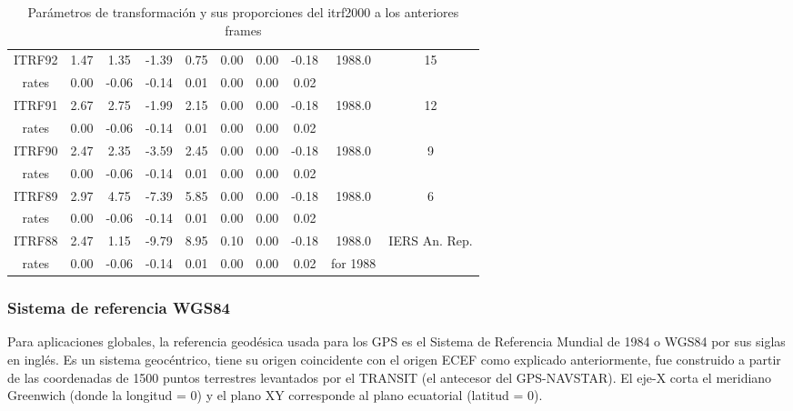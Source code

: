 \begin{table}[h!]
\begin{tabular}{@{}cccccccccc@{}}
  ITRF92   & 1.47  & 1.35  & -1.39 & 0.75  & 0.00    & 0.00    & -0.18   & 1988.0   & 15                                                             \\
  rates    & 0.00  & -0.06 & -0.14 & 0.01  & 0.00    & 0.00    & 0.02    &          &                                                                \\
  ITRF91   & 2.67  & 2.75  & -1.99 & 2.15  & 0.00    & 0.00    & -0.18   & 1988.0   & 12                                                             \\
  rates    & 0.00  & -0.06 & -0.14 & 0.01  & 0.00    & 0.00    & 0.02    &          &                                                                \\
  ITRF90   & 2.47  & 2.35  & -3.59 & 2.45  & 0.00    & 0.00    & -0.18   & 1988.0   & 9                                                              \\
  rates    & 0.00  & -0.06 & -0.14 & 0.01  & 0.00    & 0.00    & 0.02    &          &                                                                \\
  ITRF89   & 2.97  & 4.75  & -7.39 & 5.85  & 0.00    & 0.00    & -0.18   & 1988.0   & 6                                                              \\
  rates    & 0.00  & -0.06 & -0.14 & 0.01  & 0.00    & 0.00    & 0.02    &          &                                                                \\
  ITRF88   & 2.47  & 1.15  & -9.79 & 8.95  & 0.10    & 0.00    & -0.18   & 1988.0   & IERS An. Rep.                                                  \\
  rates    & 0.00  & -0.06 & -0.14 & 0.01  & 0.00    & 0.00    & 0.02    & for 1988 &                                                                \\ \bottomrule
  \end{tabular}
  \caption{Parámetros de transformación y sus proporciones del itrf2000 a los anteriores frames }
  \label{tabsig2}
\end{table}

\subsubsection{Sistema de referencia WGS84}

Para aplicaciones globales, la referencia geodésica  usada para los GPS es el Sistema de Referencia Mundial de 1984 o WGS84 por sus siglas en inglés. Es un sistema geocéntrico, tiene su origen coincidente con el origen ECEF como explicado anteriormente, fue construido a partir de las coordenadas de 1500 puntos terrestres levantados por el TRANSIT (el antecesor del GPS-NAVSTAR). El eje-X corta el meridiano Greenwich (donde la longitud = 0)  y el plano XY corresponde al plano ecuatorial (latitud = 0).

